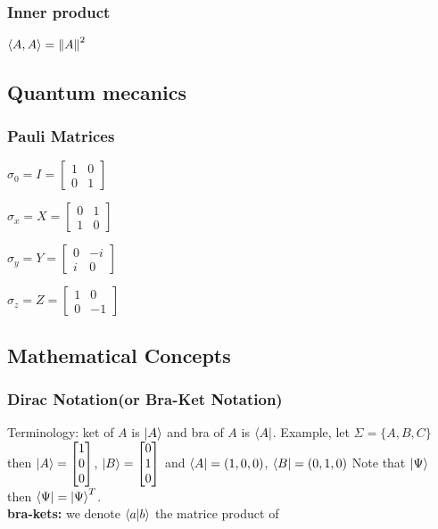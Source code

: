\documentclass[5pt]{article}
\begin{document}
\begin{multicols}{3}
\subsubsection{Inner product}
\begin{properties}
     $\langle A,A\rangle=\norm{A}^2$\\
\end{properties}




\subsection{Quantum mecanics}
\subsubsection{Pauli Matrices}
\begin{itemize*}
     \item $\sigma_0 = I = \begin{bmatrix}1 & 0 \\ 0 & 1\end{bmatrix}$
     \item $\sigma_x = X = \begin{bmatrix}0 & 1 \\ 1 & 0\end{bmatrix}$
     \item $\sigma_y = Y = \begin{bmatrix}0 & -i \\ i & 0\end{bmatrix}$
     \item $\sigma_z = Z = \begin{bmatrix}1 & 0 \\ 0 & -1\end{bmatrix}$
\end{itemize*}




\newpage





\subsection{Mathematical Concepts}

\subsubsection{Dirac Notation\footnotesize{(or Bra-Ket Notation)}}
Terminology: ket of $A$ is $\ket{A}$ and bra of $A$ is $\bra{A}$.
Example, let $\Sigma=\{A,B,C\}$ then $\ket{A}=\begin{bmatrix}1\\0\\0 \end{bmatrix}$, $\ket{B}=\begin{bmatrix}0\\1\\0 \end{bmatrix}$
and $\bra{A}=(1,0,0)$, $\bra{B}=(0,1,0)$
Note that $\ket{\Psi}$ then $\bra{\Psi}=\ket{\Psi}^T$.\\
\textbf{bra-kets:} we denote $\braket{a}{b}$ the matrice product of 



\end{multicols}
\end{document}
